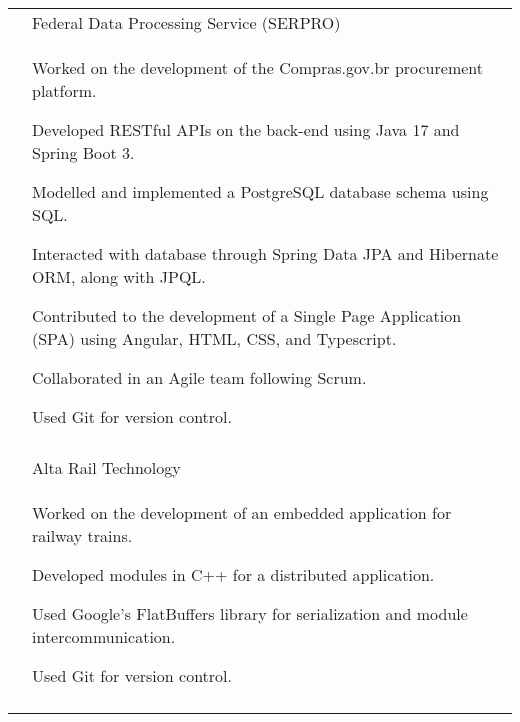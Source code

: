 \documentclass[a4paper,12pt]{article}
\begin{document}
\begin{longtable}{r|p{14.3cm}}
 & Federal Data Processing Service (SERPRO) \\*
 &\footnotesize{
    \begin{itemize*}[label=\Large\textbullet]
        \item Worked on the development of the Compras.gov.br procurement platform.
        \item Developed RESTful APIs on the back-end using Java 17 and Spring Boot 3.
        \item Modelled and implemented a \mbox{PostgreSQL} database schema using SQL.
        \item Interacted with database through Spring Data JPA and Hibernate ORM, along with JPQL.
        \item Contributed to the development of a Single Page Application (SPA) using Angular, HTML, CSS, and Typescript.
        \item Collaborated in an Agile team following Scrum.
        \item Used Git for version control.
     \end{itemize*}
}
 \\ \\

 & Alta Rail Technology \\*
 &\footnotesize{
    \begin{itemize*}[label=\Large\textbullet]
        \item Worked on the development of an embedded application for railway trains.
        \item \mbox{Developed} modules in C++ for a distributed application.
        \item Used Google's FlatBuffers library for \mbox{serialization} and module intercommunication.
        \item Used Git for version control.
     \end{itemize*}
 }
 \\ \\


\end{longtable}
\end{document}
